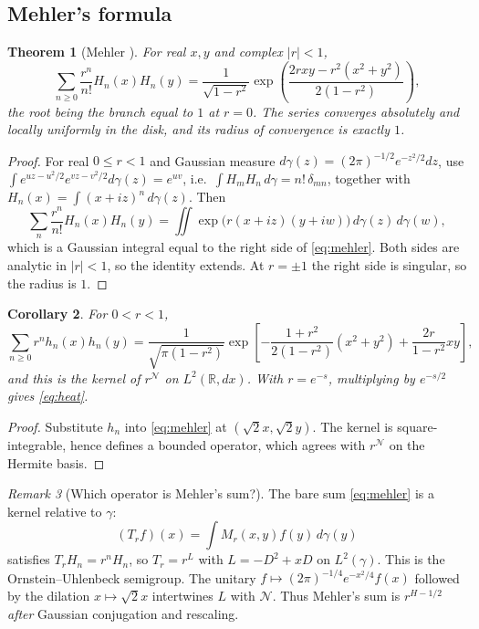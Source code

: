 \documentclass[11pt,reqno]{amsart}
\newtheorem{theorem}{Theorem}[section]
\newtheorem{corollary}[theorem]{Corollary}
\theoremstyle{definition}
\theoremstyle{remark}
\newtheorem{remark}[theorem]{Remark}
\newcommand{\R}{\mathbb R}
\newcommand{\NN}{\mathcal N}
\begin{document}
\subsection{Mehler's formula}
\begin{theorem}[Mehler \cite{Mehler1866}]\label{thm:mehler}
For real $x,y$ and complex $|r|<1$,
\begin{equation}\label{eq:mehler}
\sum_{n\ge0}\frac{r^n}{n!}H_n(x)H_n(y)
=\frac1{\sqrt{1-r^2}}
\exp\left(\frac{2rxy-r^2(x^2+y^2)}{2(1-r^2)}\right),
\end{equation}
the root being the branch equal to $1$ at $r=0$. The series converges
absolutely and locally uniformly in the disk, and its radius of
convergence is exactly $1$.
\end{theorem}
\begin{proof}
For real $0\le r<1$ and Gaussian measure
$d\gamma(z)=(2\pi)^{-1/2}e^{-z^2/2}dz$, use
$\int e^{uz-u^2/2}e^{vz-v^2/2}d\gamma(z)=e^{uv}$, i.e.\
$\int H_mH_n\,d\gamma=n!\,\delta_{mn}$, together with
$H_n(x)=\int(x+iz)^n\,d\gamma(z)$. Then
\[
\sum_n\frac{r^n}{n!}H_n(x)H_n(y)
=\iint\exp\big(r(x+iz)(y+iw)\big)\,d\gamma(z)\,d\gamma(w),
\]
which is a Gaussian integral equal to the right side of \eqref{eq:mehler}.
Both sides are analytic in $|r|<1$, so the identity extends.
At $r=\pm1$ the right side is singular, so the radius is $1$.
\end{proof}

\begin{corollary}\label{cor:mehlerL2}
For $0<r<1$,
\begin{equation}\label{eq:mehlernorm}
\sum_{n\ge0}r^nh_n(x)h_n(y)
=\frac1{\sqrt{\pi(1-r^2)}}
\exp\left[-\frac{1+r^2}{2(1-r^2)}(x^2+y^2)+\frac{2r}{1-r^2}xy\right],
\end{equation}
and this is the kernel of $r^{\NN}$ on $L^2(\R,dx)$. With $r=e^{-s}$,
multiplying by $e^{-s/2}$ gives \eqref{eq:heat}.
\end{corollary}
\begin{proof}
Substitute $h_n$ into \eqref{eq:mehler} at $(\sqrt2x,\sqrt2y)$.
The kernel is square-integrable, hence defines a bounded operator,
which agrees with $r^{\NN}$ on the Hermite basis.
\end{proof}

\begin{remark}[Which operator is Mehler's sum?]
The bare sum \eqref{eq:mehler} is a kernel relative to $\gamma$:
\[
(T_rf)(x)=\int M_r(x,y)f(y)\,d\gamma(y)
\]
satisfies $T_rH_n=r^nH_n$, so $T_r=r^{L}$ with $L=-D^2+xD$ on
$L^2(\gamma)$. This is the Ornstein--Uhlenbeck semigroup. The unitary
$f\mapsto(2\pi)^{-1/4}e^{-x^2/4}f(x)$ followed by the dilation
$x\mapsto\sqrt2x$ intertwines $L$ with $\NN$. Thus Mehler's sum is
$r^{H-1/2}$ \emph{after} Gaussian conjugation and rescaling.
\end{remark}
\end{document}
